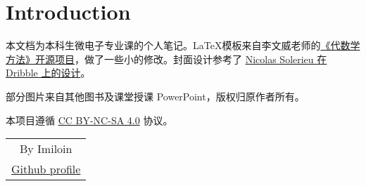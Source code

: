 \chapter*{Introduction}
	本文档为本科生微电子专业课的个人笔记。\LaTeX 模板来自李文威老师的\href{https://github.com/wenweili/AlJabr-1}{《代数学方法》开源项目}，做了一些小的修改。封面设计参考了 \href{https://dribbble.com/shots/21647162-Bento-boxes}{Nicolas Solerieu 在 Dribble 上的设计}。

	部分图片来自其他图书及课堂授课 PowerPoint，版权归原作者所有。

	本项目遵循 \href{https://creativecommons.org/licenses/by-nc-sa/4.0/}{CC BY-NC-SA 4.0} 协议。
	\vspace{1em}
	\begin{flushright}\begin{minipage}{0.2 \textwidth}
		\begin{tabular}{c}
			{By Imiloin} \\
			\href{https://github.com/Imiloin}{Github profile}\\
		\end{tabular}
	\end{minipage}\end{flushright}
